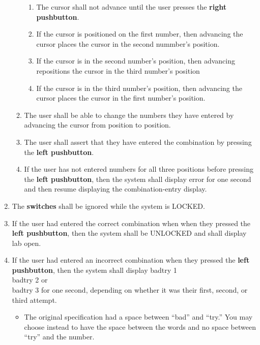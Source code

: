 \begin{enumerate}
\begin{enumerate}
        \begin{enumerate}
        \item The cursor shall not advance until the user presses the
            \textbf{right pushbutton}.
        \item If the cursor is positioned on the first number, then
            advancing the cursor places the cursor in the second nummber's
            position.
        \item If the cursor is in the second number's position, then
            advancing repositions the cursor in the third number's position
        \item If the cursor is in the third number's position, then
            advancing the cursor places the cursor in the first number's
            position.
        \end{enumerate}
    \item The user shall be able to change the numbers they have entered by
        advancing the cursor from position to position.
    \item The user shall assert that they have entered the combination by
        pressing the \textbf{left pushbutton}.
    \item If the user has not entered numbers for all three positions before
        pressing the \textbf{left pushbutton}, then the system shall display
        {\dviiseg error} for one second and then resume displaying
        the combination-entry display.
    \end{enumerate}
\item The \textbf{switches} shall be ignored while the system is LOCKED.
\item If the user had entered the correct combination when when they pressed
    the \textbf{left pushbutton}, then the system shall be UNLOCKED and shall
    display {\dviiseg lab open}.
\item If the user had entered an incorrect combination when they pressed the
    \textbf{left pushbutton}, then the system shall display
    {\dviiseg badtry 1} \\ {\dviiseg badtry 2} or \\ {\dviiseg badtry 3} for
    one second, depending on whether it was their first, second, or third
    attempt.
    \begin{itemize}
    \item The original specification had a space between ``bad'' and ``try.''
        You may choose instead to have the space between the words and no space
        between ``try'' and the number.

\end{itemize}
\end{enumerate}
